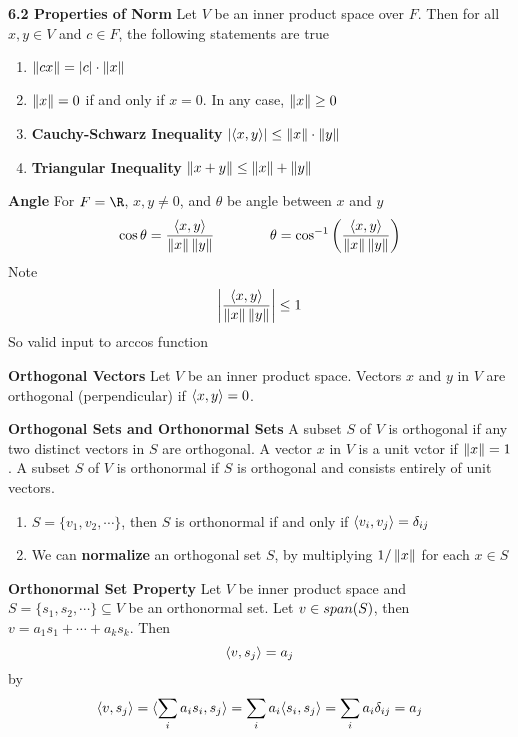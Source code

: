 \documentclass[11pt]{article}
\begin{document}
\begin{defn*}
    \textbf{6.2 Properties of Norm} Let $V$ be an inner product space over $F$. Then for all $x,y\in V$ and $c\in F$, the following statements are true 
    \begin{enumerate}
        \item $\left\lVert cx\right\rVert = |c| \cdot \left\lVert x\right\rVert$ 
        \item $\left\lVert x\right\rVert = 0$ if and only if $x=0$. In any case, $\left\lVert x\right\rVert \geq 0$ 
        \item \textbf{Cauchy-Schwarz Inequality} $|\langle x,y\rangle| \leq \left\lVert x\right\rVert \cdot \left\lVert y\right\rVert$
        \item \textbf{Triangular Inequality} $\left\lVert x+y\right\rVert \leq \left\lVert x\right\rVert + \left\lVert y\right\rVert$
    \end{enumerate}
\end{defn*}

\begin{defn*}
    \textbf{Angle} For $F=\R$, $x,y \neq 0$, and $\theta$ be angle between $x$ and $y$
    \[
        \cos{\theta} = \frac{\langle x,y\rangle}{\left\lVert x\right\rVert\left\lVert y\right\rVert}
        \quad \quad \quad \quad 
        \theta = \cos^{-1}\left( \frac{\langle x,y\rangle}{\left\lVert x\right\rVert\left\lVert y\right\rVert} \right)
    \]
    Note
    \[
        \left|\frac{\langle x,y\rangle}{\left\lVert x\right\rVert\left\lVert y\right\rVert}\right| \leq 1
    \]
    So valid input to arccos function
\end{defn*}

\begin{defn*}
    \textbf{Orthogonal Vectors} Let $V$ be an inner product space. Vectors $x$ and $y$ in $V$ are orthogonal (perpendicular) if $\langle x,y\rangle = 0$.
\end{defn*}

\begin{defn*}
    \textbf{Orthogonal Sets and Orthonormal Sets} A subset $S$ of $V$ is orthogonal if any two distinct vectors in $S$ are orthogonal. A vector $x$ in $V$ is a unit vctor if $\left\lVert x\right\rVert = 1$. A subset $S$ of $V$ is orthonormal if $S$ is orthogonal and consists entirely of unit vectors. 
    \begin{enumerate}
        \item $S = \{v_1,v_2,\cdots\}$, then $S$ is orthonormal if and only if $\langle v_i,v_j\rangle = \delta_{ij}$
        \item We can \textbf{normalize} an orthogonal set $S$, by multiplying $1/\left\lVert x\right\rVert$ for each $x\in S$
    \end{enumerate}
\end{defn*}


\begin{defn*}
    \textbf{Orthonormal Set Property} Let $V$ be inner product space and $S = \{s_1,s_2,\cdots\}\subseteq V$ be an orthonormal set. Let $v\in span(S)$, then $v = a_1s_1 + \cdots + a_k s_k$. Then 
    \[
        \langle v,s_j\rangle = a_j    
    \]
    by
    \[
        \langle v,s_j\rangle = \langle\sum_i a_i s_i,s_j\rangle = \sum_i a_i \langle s_i,s_j\rangle = \sum_i a_i \delta_{ij} = a_j    
    \]
\end{defn*}
\end{document}
